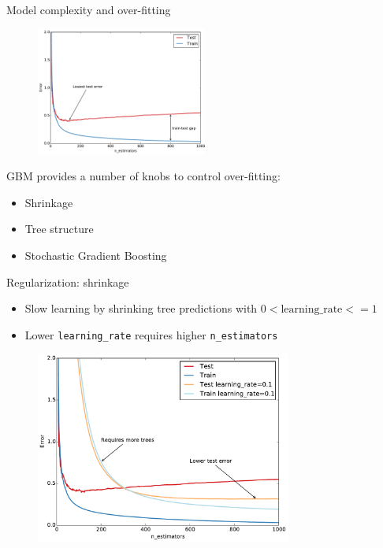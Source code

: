 \documentclass{beamer}
\begin{document}
\begin{frame}[fragile]{Model complexity and over-fitting}

   \begin{figure}
     \centering
       \includegraphics[width=0.5\textwidth]{figures/overfitting.pdf}
   \end{figure}


     GBM provides a number of knobs to control over-fitting:
     \begin{itemize}
       \item Shrinkage
       \item Tree structure
       \item Stochastic Gradient Boosting
     \end{itemize}
\end{frame}


\begin{frame}{Regularization: shrinkage}

    \begin{itemize}
      \item Slow learning by shrinking tree predictions with $0 < \text{learning\_rate} <= 1$
      \item Lower \texttt{learning\_rate} requires higher \texttt{n\_estimators}
    \end{itemize}

   \begin{figure}
     \centering
       \includegraphics[width=0.75\textwidth]{figures/regularization-learning-rate.pdf}
   \end{figure}

\end{frame}
\end{document}
